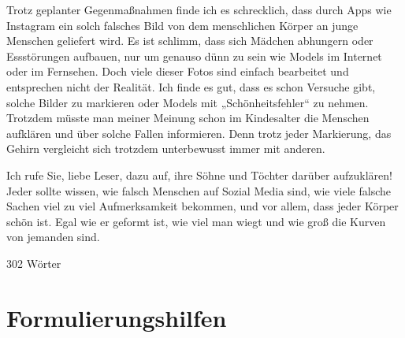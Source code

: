 Trotz geplanter Gegenmaßnahmen finde ich es schrecklich, dass durch Apps wie Instagram ein solch falsches Bild von dem menschlichen Körper an junge Menschen geliefert wird. Es ist schlimm, dass sich Mädchen abhungern oder Essstörungen aufbauen, nur um genauso dünn zu sein wie Models im Internet oder im Fernsehen. Doch viele dieser Fotos sind einfach bearbeitet und entsprechen nicht der Realität. Ich finde es gut, dass es schon Versuche gibt, solche Bilder zu markieren oder Models mit „Schönheitsfehler“ zu nehmen. Trotzdem müsste man meiner Meinung schon im Kindesalter die Menschen aufklären und über solche Fallen informieren. Denn trotz jeder Markierung, das Gehirn vergleicht sich trotzdem unterbewusst immer mit anderen. 

Ich rufe Sie, liebe Leser, dazu auf, ihre Söhne und Töchter darüber aufzuklären! Jeder sollte wissen, wie falsch Menschen auf Sozial Media sind, wie viele falsche Sachen viel zu viel Aufmerksamkeit bekommen, und vor allem, dass jeder Körper schön ist. Egal wie er geformt ist, wie viel man wiegt und wie groß die Kurven von jemanden sind. 

302 Wörter 


\section{Formulierungshilfen}


